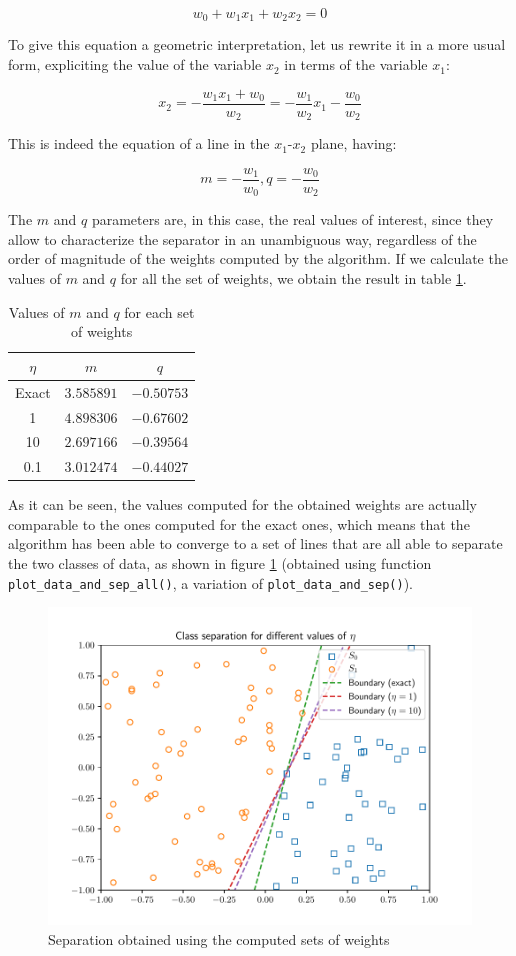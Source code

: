 \documentclass[letterpaper,headings=standardclasses]{scrartcl}
\begin{document}
$$ w_0 + w_1x_1 + w_2x_2 = 0 $$

To give this equation a geometric interpretation, let us rewrite it in a more usual form, expliciting the value of the variable $x_2$ in terms of the variable $x_1$:

$$ x_2 = -\frac{w_1x_1 + w_0}{w_2} = -\frac{w_1}{w_2}x_1 -\frac{w_0}{w_2} $$

This is indeed the equation of a line in the $x_1$-$x_2$ plane, having:

$$ m = -\frac{w_1}{w_0}, q = -\frac{w_0}{w_2} $$

The $m$ and $q$ parameters are, in this case, the real values of interest, since they allow to characterize the separator in an unambiguous way, regardless of the order of magnitude of the weights computed by the algorithm. If we calculate the values of $m$ and $q$ for all the set of weights, we obtain the result in table \ref{m_q_weights}.

\begin{table}[h]
\centering
\begin{tabular}{|c|c|c|}
\hline
$\eta$ & $m$ & $q$ \\ \hline
Exact  & $3.585891$ & $-0.50753$ \\ \hline
1      & $4.898306$ & $-0.67602$ \\ \hline
10     & $2.697166$ & $-0.39564$ \\ \hline
0.1    & $3.012474$ & $-0.44027$ \\ \hline
\end{tabular}
\caption{Values of $m$ and $q$ for each set of weights}
\label{m_q_weights}
\end{table}

As it can be seen, the values computed for the obtained weights are actually comparable to the ones computed for the exact ones, which means that the algorithm has been able to converge to a set of lines that are all able to separate the two classes of data, as shown in figure \ref{all_sep} (obtained using function \texttt{plot\_data\_and\_sep\_all()}, a variation of \texttt{plot\_data\_and\_sep()}).

\begin{figure}[h]
\centering
\includegraphics[width=0.7\linewidth]{all_sep.pdf}
\caption{Separation obtained using the computed sets of weights}
\label{all_sep}
\end{figure}
\end{document}
